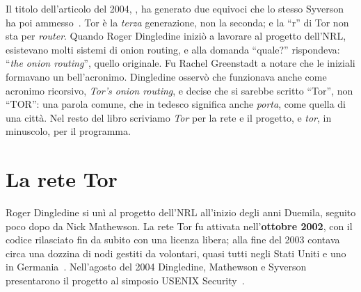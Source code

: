 \begin{storia}[Il nome]
Il titolo dell'articolo del 2004, , ha generato due equivoci che lo stesso Syverson ha poi ammesso~\cite{syverson2011peel}. Tor è la \emph{terza} generazione, non la seconda; e la \enquote{r} di Tor non sta per \emph{router}. Quando Roger Dingledine iniziò a lavorare al progetto dell'NRL, esistevano molti sistemi di onion routing, e alla domanda \enquote{quale?} rispondeva: \enquote{\emph{the onion routing}}, quello originale. Fu Rachel Greenstadt a notare che le iniziali formavano un bell'acronimo. Dingledine osservò che funzionava anche come acronimo ricorsivo, \emph{Tor's onion routing}, e decise che si sarebbe scritto \enquote{Tor}, non \enquote{TOR}: una parola comune, che in tedesco significa anche \emph{porta}, come quella di una città. Nel resto del libro scriviamo \emph{Tor} per la rete e il progetto, e \emph{tor}, in minuscolo, per il programma.
\end{storia}

\section{La rete Tor}\label{sec:nascita-rete}

Roger Dingledine si unì al progetto dell'NRL all'inizio degli anni Duemila, seguito poco dopo da Nick Mathewson. La rete Tor fu attivata nell'\textbf{ottobre 2002}, con il codice rilasciato fin da subito con una licenza libera; alla fine del 2003 contava circa una dozzina di nodi gestiti da volontari, quasi tutti negli Stati Uniti e uno in Germania~\cite{torhistory}. Nell'agosto del 2004 Dingledine, Mathewson e Syverson presentarono il progetto al simposio USENIX Security~\cite{dingledine2004tor}.


